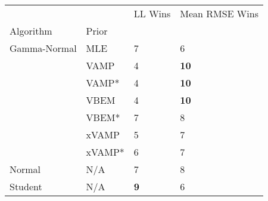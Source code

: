\begin{tabular}{llll}
\toprule
        &     &     LL Wins & Mean RMSE Wins \\
Algorithm & Prior &             &                \\
\midrule
Gamma-Normal & MLE &           7 &              6 \\
        & VAMP &           4 &    \textbf{10} \\
        & VAMP* &           4 &    \textbf{10} \\
        & VBEM &           4 &    \textbf{10} \\
        & VBEM* &           7 &              8 \\
        & xVAMP &           5 &              7 \\
        & xVAMP* &           6 &              7 \\
Normal & N/A &           7 &              8 \\
Student & N/A &  \textbf{9} &              6 \\
\bottomrule
\end{tabular}

